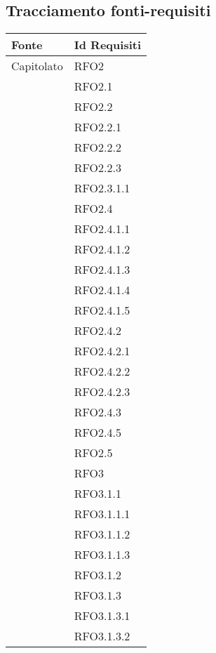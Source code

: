\subsection{Tracciamento fonti-requisiti} \label{tab tracciamento}

\begin{center}
    \begin{longtable}{ | >{\centering\arraybackslash}m{5cm} | >{\centering\arraybackslash}m{5cm} | }
        
        \hline
        \textbf{Fonte} & \textbf{Id Requisiti} \\ \hline
        \endhead
        
        Capitolato & RFO2\\
            & RFO2.1 \\
            & RFO2.2 \\
            & RFO2.2.1 \\
            & RFO2.2.2 \\
            & RFO2.2.3 \\
            & RFO2.3.1.1 \\
            & RFO2.4 \\
            & RFO2.4.1.1 \\
            & RFO2.4.1.2 \\
            & RFO2.4.1.3 \\
            & RFO2.4.1.4 \\
            & RFO2.4.1.5 \\
            & RFO2.4.2 \\
            & RFO2.4.2.1 \\
            & RFO2.4.2.2 \\
            & RFO2.4.2.3 \\
            & RFO2.4.3 \\
            & RFO2.4.5 \\
            & RFO2.5 \\
            & RFO3 \\
            & RFO3.1.1 \\
            & RFO3.1.1.1 \\
            & RFO3.1.1.2 \\
            & RFO3.1.1.3 \\
            & RFO3.1.2 \\
            & RFO3.1.3 \\
            & RFO3.1.3.1 \\
            & RFO3.1.3.2 \\

\end{longtable}
\end{center}

